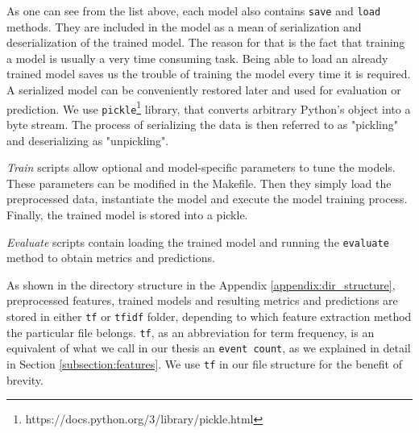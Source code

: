 As one can see from the list above, each model also contains \texttt{save} and \texttt{load} methods. They are included in the model as a mean of serialization and deserialization of the trained model. The reason for that is the fact that training a model is usually a very time consuming task. Being able to load an already trained model saves us the trouble of training the model every time it is required. A serialized model can be conveniently restored later and used for evaluation or prediction. We use \texttt{pickle}\footnote{https://docs.python.org/3/library/pickle.html} library, that converts arbitrary Python's object into a byte stream. The process of serializing the data is then referred to as "pickling" and deserializing as "unpickling".

\textit{Train} scripts allow optional and model-specific parameters to tune the models. These parameters can be modified in the Makefile. Then they simply load the preprocessed data, instantiate the model and execute the model training process. Finally, the trained model is stored into a pickle. 
 
\textit{Evaluate} scripts contain loading the trained model and running the \texttt{\justify evaluate} method to obtain metrics and predictions.

As shown in the directory structure in the Appendix \ref{appendix:dir_structure}, preprocessed features, trained models and resulting metrics and predictions are stored in either \texttt{tf} or \texttt{tfidf} folder, depending to which feature extraction method the particular file belongs. \texttt{tf}, as an abbreviation for term frequency, is an equivalent of what we call in our thesis an \texttt{event count}, as we explained in detail in Section \ref{subsection:features}. We use \texttt{tf} in our file structure for the benefit of brevity.

 

